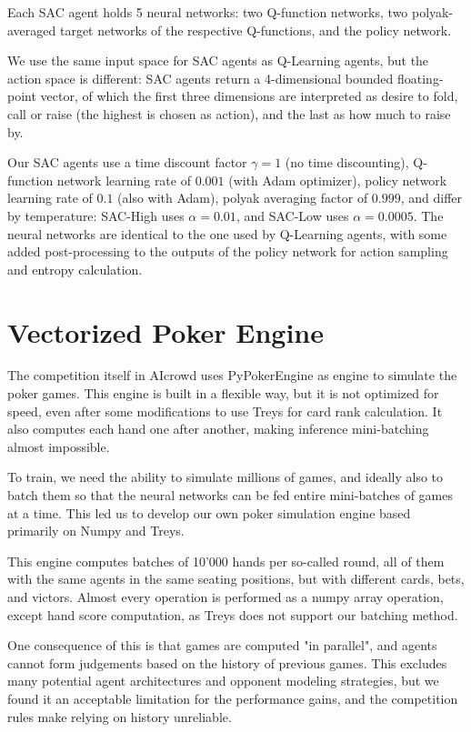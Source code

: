 Each SAC agent holds 5 neural networks: two Q-function networks, two polyak-averaged target networks of the respective Q-functions, and the policy network.

We use the same input space for SAC agents as Q-Learning agents, but the action space is different: SAC agents return a 4-dimensional bounded floating-point vector, of which the first three dimensions are interpreted as desire to fold, call or raise (the highest is chosen as action), and the last as how much to raise by.

Our SAC agents use a time discount factor $\gamma = 1$ (no time discounting), Q-function network learning rate of $0.001$ (with Adam optimizer), policy network learning rate of $0.1$ (also with Adam), polyak averaging factor of $0.999$, and differ by temperature: SAC-High uses $\alpha = 0.01$, and SAC-Low uses $\alpha = 0.0005$. The neural networks are identical to the one used by Q-Learning agents, with some added post-processing to the outputs of the policy network for action sampling and entropy calculation.

\section{Vectorized Poker Engine}
The competition itself in AIcrowd uses PyPokerEngine \cite{Pypokerengine} as engine to simulate the poker games. This engine is built in a flexible way, but it is not optimized for speed, even after some modifications to use Treys \cite{Treys} for card rank calculation. It also computes each hand one after another, making inference mini-batching almost impossible.

To train, we need the ability to simulate millions of games, and ideally also to batch them so that the neural networks can be fed entire mini-batches of games at a time. This led us to develop our own poker simulation engine based primarily on Numpy \cite{Numpy} and Treys.

This engine computes batches of 10'000 hands per so-called round, all of them with the same agents in the same seating positions, but with different cards, bets, and victors. Almost every operation is performed as a numpy array operation, except hand score computation, as Treys does not support our batching method.

One consequence of this is that games are computed "in parallel", and agents cannot form judgements based on the history of previous games. This excludes many potential agent architectures and opponent modeling strategies, but we found it an acceptable limitation for the performance gains, and the competition rules make relying on history unreliable.

